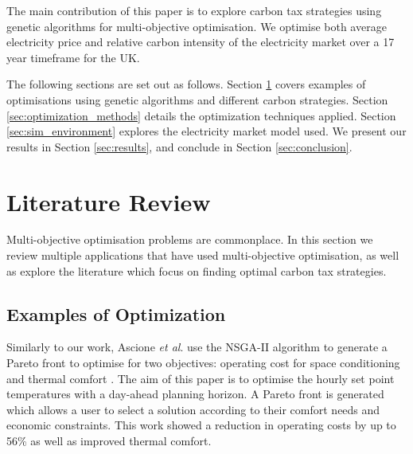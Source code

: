 \documentclass[sigconf]{acmart}
\begin{document}
The main contribution of this paper is to explore carbon tax strategies using genetic algorithms for multi-objective optimisation. We optimise both average electricity price and relative carbon intensity of the electricity market over a 17 year timeframe for the UK.

The following sections are set out as follows. Section \ref{sec:lit_review} covers examples of optimisations using genetic algorithms and different carbon strategies. Section \ref{sec:optimization_methods} details the optimization techniques applied. Section \ref{sec:sim_environment} explores the electricity market model used. We present our results in Section \ref{sec:results}, and conclude in Section \ref{sec:conclusion}.











\section{Literature Review}
\label{sec:lit_review}

Multi-objective optimisation problems are commonplace. In this section we review multiple applications that have used multi-objective optimisation, as well as explore the literature which focus on finding optimal carbon tax strategies.

\subsection{Examples of Optimization}

Similarly to our work, Ascione  \textit{et al}. use the NSGA-II algorithm to generate a Pareto front to optimise for two objectives: operating cost for space conditioning and thermal comfort \cite{Ascione2016}. The aim of this paper is to optimise the hourly set point temperatures with a day-ahead planning horizon. A Pareto front is generated which allows a user to select a solution according to their comfort needs and economic constraints. This work showed a reduction in operating costs by up to 56\% as well as improved thermal comfort.
\end{document}
